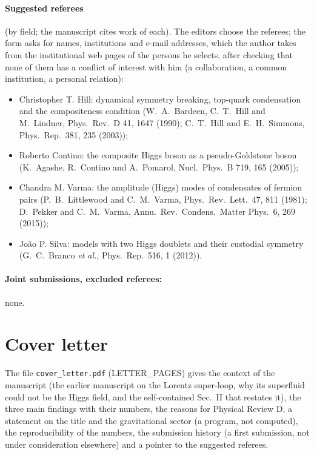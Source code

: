 \documentclass[11pt]{article}
\begin{document}
\paragraph{Suggested referees} (by field; the manuscript cites work of each). The editors choose the referees; the form
asks for names, institutions and e-mail addresses, which the author takes from the institutional web pages of the persons
he selects, after checking that none of them has a conflict of interest with him (a collaboration, a common institution,
a personal relation):
\begin{itemize}
\item Christopher T. Hill: dynamical symmetry breaking, top-quark condensation and the compositeness condition (W.~A.~Bardeen,
C.~T.~Hill and M.~Lindner, Phys.\ Rev.\ D 41, 1647 (1990); C.~T.~Hill and E.~H.~Simmons, Phys.\ Rep.\ 381, 235 (2003));
\item Roberto Contino: the composite Higgs boson as a pseudo-Goldstone boson (K.~Agashe, R.~Contino and A.~Pomarol, Nucl.\
Phys.\ B 719, 165 (2005));
\item Chandra M. Varma: the amplitude (Higgs) modes of condensates of fermion pairs (P.~B.~Littlewood and C.~M.~Varma,
Phys.\ Rev.\ Lett.\ 47, 811 (1981); D.~Pekker and C.~M.~Varma, Annu.\ Rev.\ Condens.\ Matter Phys.\ 6, 269 (2015));
\item Jo\~ao P. Silva: models with two Higgs doublets and their custodial symmetry (G.~C.~Branco \emph{et al.}, Phys.\
Rep.\ 516, 1 (2012)).
\end{itemize}

\paragraph{Joint submissions, excluded referees:} none.

\section{Cover letter}

The file \texttt{cover\_letter.pdf} ({{LETTER_PAGES}}) gives the context of the manuscript (the earlier manuscript
on the Lorentz super-loop, why its superfluid could not be the Higgs field, and the self-contained Sec.~II that restates
it), the three main findings with their numbers, the reasons for Physical Review D, a statement on
the title and the gravitational sector (a program, not computed), the reproducibility of the numbers, the submission
history (a first submission, not under consideration elsewhere) and a pointer to the suggested referees.
\end{document}
